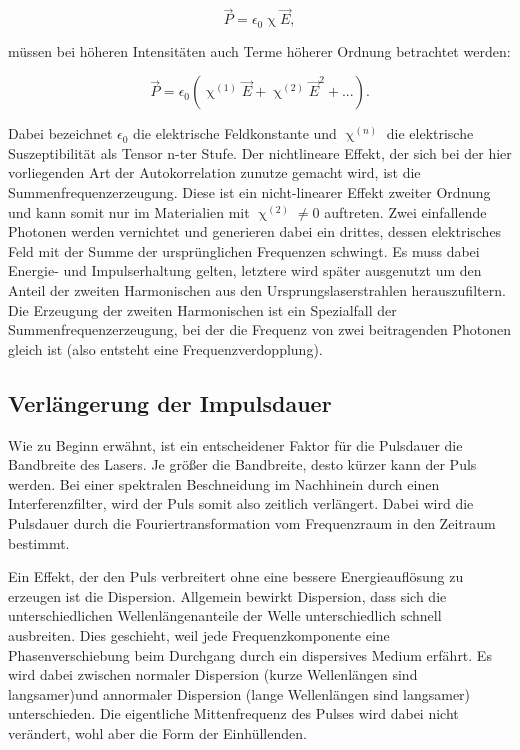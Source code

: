 \begin{equation}
    \vec P = \epsilon_0 \upchi \vec E,
\end{equation}

müssen bei höheren Intensitäten auch Terme höherer Ordnung betrachtet werden:

\begin{equation}
    \vec P = \epsilon_0 (\upchi ^{(1)}\vec E+\upchi ^{(2)}\vec E^2 +...).
\end{equation}

Dabei bezeichnet $\epsilon_0$ die elektrische Feldkonstante und $\upchi ^ {(n)}$ die elektrische Suszeptibilität als Tensor n-ter Stufe.
Der nichtlineare Effekt, der sich bei der hier vorliegenden Art der Autokorrelation zunutze gemacht wird,
ist die Summenfrequenzerzeugung. Diese ist ein nicht-linearer Effekt zweiter Ordnung und kann somit nur im Materialien mit $\upchi ^ {(2)}\neq 0$ auftreten.
Zwei einfallende Photonen werden vernichtet und generieren dabei ein drittes, dessen elektrisches Feld mit der 
Summe der ursprünglichen Frequenzen schwingt. 
Es muss dabei Energie- und Impulserhaltung gelten, letztere wird später ausgenutzt um den Anteil der zweiten Harmonischen aus den Ursprungslaserstrahlen herauszufiltern.
Die Erzeugung der zweiten Harmonischen ist ein Spezialfall der Summenfrequenzerzeugung, bei der die Frequenz von zwei beitragenden Photonen gleich ist (also entsteht eine Frequenzverdopplung).



\subsection{Verlängerung der Impulsdauer}
Wie zu Beginn erwähnt, ist ein entscheidener Faktor für die Pulsdauer die Bandbreite des Lasers.
Je größer die Bandbreite, desto kürzer kann der Puls werden.
Bei einer spektralen Beschneidung im Nachhinein durch einen Interferenzfilter, wird
der Puls somit also zeitlich verlängert. 
Dabei wird die Pulsdauer durch die Fouriertransformation vom Frequenzraum in den Zeitraum bestimmt.


Ein Effekt, der den Puls verbreitert ohne eine bessere Energieauflösung zu erzeugen ist die Dispersion.
Allgemein bewirkt Dispersion, dass sich die unterschiedlichen Wellenlängenanteile der Welle unterschiedlich schnell ausbreiten.
Dies geschieht, weil jede Frequenzkomponente eine Phasenverschiebung beim Durchgang
durch ein dispersives Medium erfährt.
Es wird dabei zwischen normaler Dispersion (kurze Wellenlängen sind langsamer)und annormaler Dispersion (lange Wellenlängen sind langsamer) unterschieden.
Die eigentliche Mittenfrequenz des Pulses wird dabei nicht verändert, wohl aber die Form der Einhüllenden.

